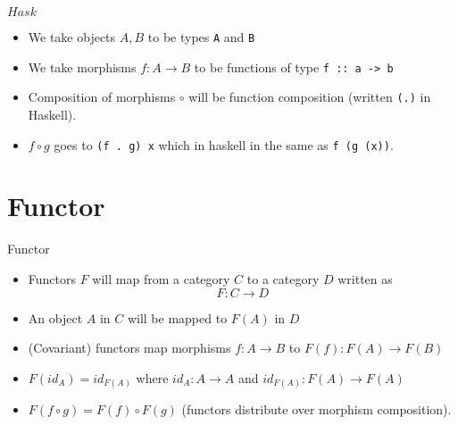 \documentclass{beamer} %
\begin{document}
\begin{frame}{$\mathit{Hask}$}
  \begin{itemize}
    \item We take objects $A,B$ to be types \texttt{A} and \texttt{B}

    \item We take morphisms $f : A\rightarrow B$ to be functions of type \mbox{\texttt{f :: a -> b}}

    \item Composition of morphisms $\circ$ will be function composition (written \texttt{(.)} in Haskell).

    \item $f \circ g$ goes to \texttt{(f . g) x} which in haskell in the same as \mbox{\texttt{f (g (x))}}.
    \end{itemize}
\end{frame}

\section{Functor}

\begin{frame}{Functor}
  \begin{itemize}
    \item Functors $F$ will map from a category $C$ to a category $D$ written as
      \[ F : C \rightarrow D \]

    \item An object $A$ in $C$ will be mapped to $F(A)$ in $D$

    \item (Covariant) functors map morphisms $f : A \rightarrow B$ to $F(f) : F(A) \rightarrow F(B)$

    \item $F(id_A) = id_{F(A)}$ where $id_A : A \rightarrow A$ and
      $id_{F(A)} : F(A) \rightarrow F(A)$

    \item $F(f \circ g) = F(f) \circ F(g) $ (functors distribute over morphism composition).
  \end{itemize}
\end{frame}
\end{document}
